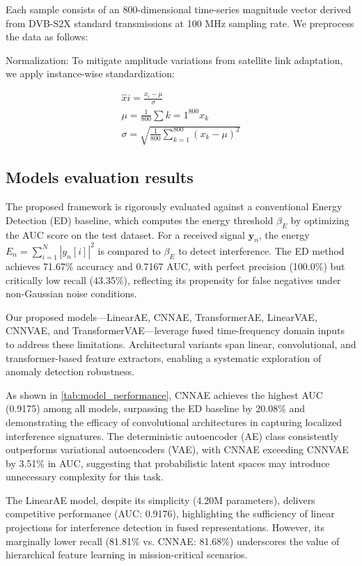 \documentclass[12pt]{article}
\begin{document}
Each sample consists of an 800-dimensional time-series magnitude vector derived from DVB-S2X standard transmissions at 100 MHz sampling rate. We preprocess the data as follows:

Normalization: To mitigate amplitude variations from satellite link adaptation, we apply instance-wise standardization:

\begin{align*}
\hat{x}i = \frac{x_i - \mu}{\sigma} \\
\mu = \frac{1}{800}\sum{k=1}^{800} x_k \\
\sigma = \sqrt{\frac{1}{800}\sum_{k=1}^{800} (x_k - \mu)^2}
\end{align*}

\subsection{Models evaluation results}

The proposed framework is rigorously evaluated against a conventional Energy Detection (ED) baseline, which computes the energy threshold $\beta_E$ by optimizing the AUC score on the test dataset. For a received signal $\mathbf{y}_n$, the energy $E_n = \sum_{i=1}^N |y_n[i]|^2$ is compared to $\beta_E$ to detect interference. The ED method achieves 71.67\% accuracy and 0.7167 AUC, with perfect precision (100.0\%) but critically low recall (43.35\%), reflecting its propensity for false negatives under non-Gaussian noise conditions.

Our proposed models—LinearAE, CNNAE, TransformerAE, LinearVAE, CNNVAE, and TransformerVAE—leverage fused time-frequency domain inputs to address these limitations. Architectural variants span linear, convolutional, and transformer-based feature extractors, enabling a systematic exploration of anomaly detection robustness.

As shown in \autoref{tab:model_performance}, CNNAE achieves the highest AUC (0.9175) among all models, surpassing the ED baseline by 20.08\% and demonstrating the efficacy of convolutional architectures in capturing localized interference signatures. The deterministic autoencoder (AE) class consistently outperforms variational autoencoders (VAE), with CNNAE exceeding CNNVAE by 3.51\% in AUC, suggesting that probabilistic latent spaces may introduce unnecessary complexity for this task.

The LinearAE model, despite its simplicity (4.20M parameters), delivers competitive performance (AUC: 0.9176), highlighting the sufficiency of linear projections for interference detection in fused representations. However, its marginally lower recall (81.81\% vs. CNNAE: 81.68\%) underscores the value of hierarchical feature learning in mission-critical scenarios.
\end{document}
